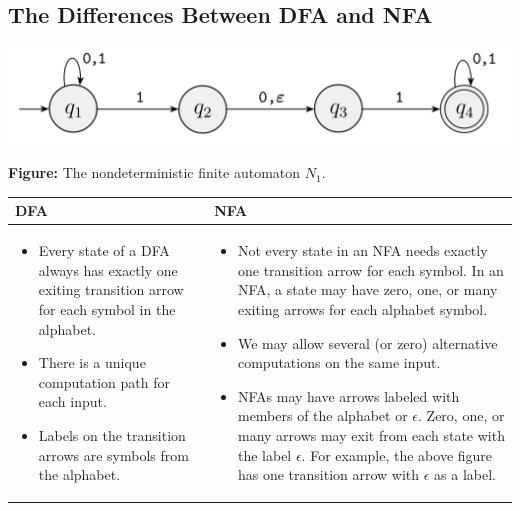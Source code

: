 \documentclass[letterpaper]{article}
\begin{document}
\subsection{The Differences Between DFA and NFA}
\begin{center}
    \includegraphics[scale=0.4]{assets/nfa_1.png}
    
    \textbf{Figure:} The nondeterministic finite automaton $N_1$. 
\end{center}

\begin{center}
    \begin{tabular}{p{3in}|p{3in}}
        \textbf{DFA} & \textbf{NFA} \\ 
        \hline 
        \begin{itemize}
            \item Every state of a DFA always has exactly one exiting transition arrow for each symbol in the alphabet.
            \item There is a unique computation path for each input. 
            \item Labels on the transition arrows are symbols from the alphabet. 
        \end{itemize} 

        & \begin{itemize}
            \item Not every state in an NFA needs exactly one transition arrow for each symbol. In an NFA, a state may have zero, one, or many exiting arrows for each alphabet symbol.
            \item We may allow several (or zero) alternative computations on the same input. 
            \item NFAs may have arrows labeled with members of the alphabet or $\epsilon$. Zero, one, or many arrows may exit from each state with the label $\epsilon$. For example, the above figure has one transition arrow with $\epsilon$ as a label. 
        \end{itemize}
    \end{tabular}
\end{center}
\end{document}
